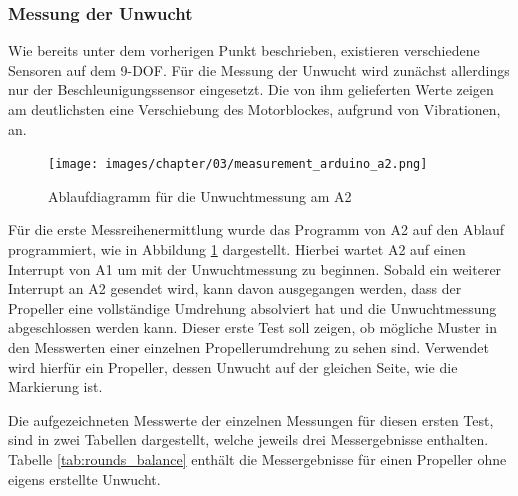 \subsubsection*{Messung der Unwucht}
Wie bereits unter dem vorherigen Punkt beschrieben, existieren verschiedene Sensoren auf dem \ac{9-DOF}.
Für die Messung der Unwucht wird zunächst allerdings nur der Beschleunigungssensor eingesetzt.
Die von ihm gelieferten Werte zeigen am deutlichsten eine Verschiebung des Motorblockes, aufgrund von Vibrationen, an.

\begin{figure}[H]
	\centering
	\texttt{[image: images/chapter/03/measurement\_arduino\_a2.png]}
	\caption{Ablaufdiagramm für die Unwuchtmessung am \ac{A2}}
	\label{fig:sequence_measure_a2}
\end{figure}

Für die erste Messreihenermittlung wurde das Programm von \ac{A2} auf den Ablauf programmiert, wie in Abbildung \ref{fig:sequence_measure_a2} dargestellt.
Hierbei wartet \ac{A2} auf einen Interrupt von \ac{A1} um mit der Unwuchtmessung zu beginnen.
Sobald ein weiterer Interrupt an \ac{A2} gesendet wird, kann davon ausgegangen werden, dass der Propeller eine vollständige Umdrehung absolviert hat und die Unwuchtmessung abgeschlossen werden kann.
Dieser erste Test soll zeigen, ob mögliche Muster in den Messwerten einer einzelnen Propellerumdrehung zu sehen sind.
Verwendet wird hierfür ein Propeller, dessen Unwucht auf der gleichen Seite, wie die Markierung ist.

Die aufgezeichneten Messwerte der einzelnen Messungen für diesen ersten Test, sind in zwei Tabellen dargestellt, welche jeweils drei Messergebnisse enthalten.
Tabelle \ref{tab:rounds_balance} enthält die Messergebnisse für einen Propeller ohne eigens erstellte Unwucht.

\begin{table}[H]
\centering
{}
\caption{Messergebnisse von Propellerumdrehungen ohne Unwucht}
\label{tab:rounds_balance}
\end{table}

